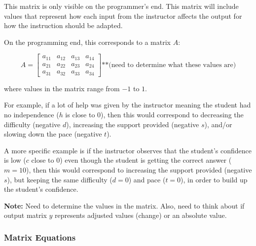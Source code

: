 \documentclass{article}
\begin{document}
        This matrix is only visible on the programmer's end. This matrix will include values that represent how each input from the instructor affects the output for how the instruction should be adapted.

        On the programming end, this corresponds to a matrix $A$:

        \[
            A = \begin{bmatrix} 
                a_{11} & a_{12} & a_{13} & a_{14} \\
                a_{21} & a_{22} & a_{23} & a_{24} \\
                a_{31} & a_{32} & a_{33} & a_{34}
            \end{bmatrix}
            \text{**(need to determine what these values are)}
        \]

        where values in the matrix range from $-1$ to $1$.

        For example, if a lot of help was given by the instructor meaning the student had no independence ($h$ is close to $0$), then this would correspond to decreasing the difficulty (negative $d$), increasing the support provided (negative $s$), and/or slowing down the pace (negative $t$).

        A more specific example is if the instructor observes that the student's confidence is low ($c$ close to $0$) even though the student is getting the correct answer ($m=10$), then this would correspond to increasing the support provided (negative $s$), but keeping the same difficulty ($d=0$) and pace ($t=0$), in order to build up the student's confidence.

        \textbf{Note:} Need to determine the values in the matrix. Also, need to think about if output matrix $y$ represents adjusted values (change) or an absolute value.

    \subsubsection{Matrix Equations}
\end{document}
